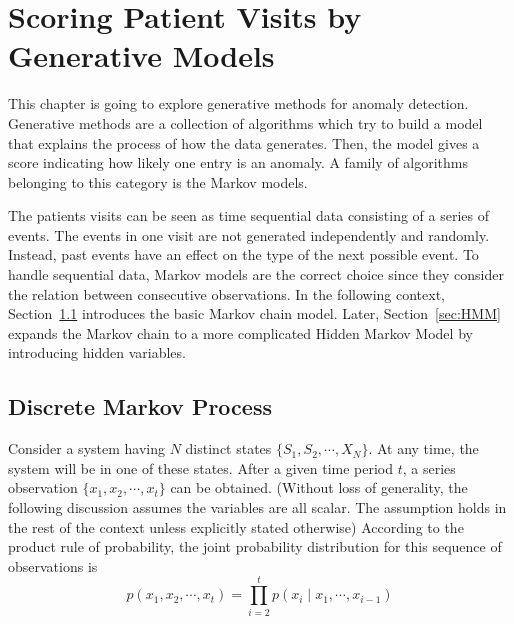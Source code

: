 \chapter{Scoring Patient Visits by Generative Models}
\label{chapter:generative}
This chapter is going to explore generative methods for anomaly detection. Generative methods are a collection of algorithms which try to build a model that explains the process of how the data generates. Then, the model gives a score indicating how likely one entry is an anomaly. A family of algorithms belonging to this category is the Markov models.

The patients visits can be seen as time sequential data consisting of a series of events. The events in one visit are not generated independently and randomly. Instead, past events have an effect on the type of the next possible event. To handle sequential data, Markov models are the correct choice since they consider the relation between consecutive observations. In the following context, Section~\ref{sec:MM} introduces the basic Markov chain model. Later, Section~\ref{sec:HMM} expands the Markov chain to a more complicated Hidden Markov Model by introducing hidden variables.

\section{Discrete Markov Process}
\label{sec:MM}
Consider a system having \(N\) distinct states \(\{S_1, S_2, \cdots, X_N\}\). At any time, the system will be in one of these states. After a given time period \(t\), a series observation \(\{x_1, x_2, \cdots, x_t\}\) can be obtained. (Without loss of generality, the following discussion assumes the variables are all scalar. The assumption holds in the rest of the context unless explicitly stated otherwise) According to the product rule of probability, the joint probability distribution for this sequence of observations is
\begin{equation}
	p(x_1, x_2, \cdots, x_t) = \prod_{i = 2}^{t} p(x_i \mid x_1, \cdots, x_{i-1})
\end{equation}

